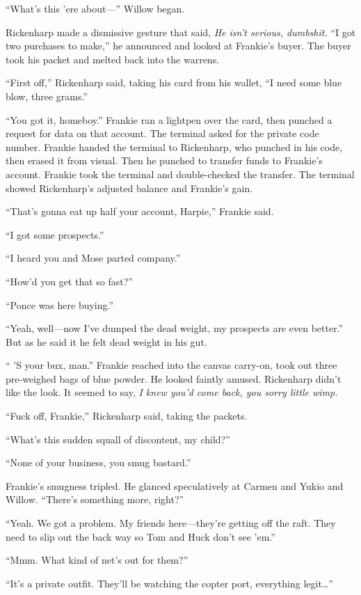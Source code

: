 ``What's this 'ere about---'' Willow began.

Rickenharp made a dismissive gesture that said, \textit{He isn't serious, dumbshit.} ``I got two purchases to make,'' he announced and looked at Frankie's buyer. The buyer took his packet and melted back into the warrens.

``First off,'' Rickenharp said, taking his card from his wallet, ``I need some blue blow, three grams.''

``You got it, homeboy.'' Frankie ran a lightpen over the card, then punched a request for data on that account. The terminal asked for the private code number. Frankie handed the terminal to Rickenharp, who punched in his code, then erased it from visual. Then he punched to transfer funds to Frankie's account. Frankie took the terminal and double-checked the transfer. The terminal showed Rickenharp's adjusted balance and Frankie's gain.

``That's gonna eat up half your account, Harpie,'' Frankie said.

``I got some prospects.''

``I heard you and Mose parted company.''

``How'd you get that so fast?''

``Ponce was here buying.''

``Yeah, well---now I've dumped the dead weight, my prospects are even better.'' But as he said it he felt dead weight in his gut.

`` 'S your bux, man.'' Frankie reached into the canvas carry-on, took out three pre-weighed bags of blue powder. He looked faintly amused. Rickenharp didn't like the look. It seemed to say, \textit{I knew you'd come back, you sorry little wimp.}

``Fuck off, Frankie,'' Rickenharp said, taking the packets.

``What's this sudden squall of discontent, my child?''

``None of your business, you smug bastard.''

Frankie's smugness tripled. He glanced speculatively at Carmen and Yukio and Willow. ``There's something more, right?''

``Yeah. We got a problem. My friends here---they're getting off the raft. They need to slip out the back way so Tom and Huck don't see 'em.''

``Mmm. What kind of net's out for them?''

``It's a private outfit. They'll be watching the copter port, everything legit\ldots ''

